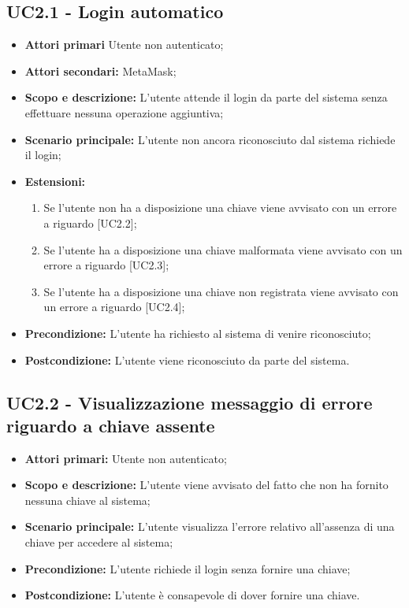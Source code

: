 \documentclass[AnalisiDeiRequisiti.tex]{subfiles}
\begin{document}
\subsection{UC2.1 - Login automatico}
\begin{itemize}
\item \textbf{Attori primari} Utente non autenticato;\\
\item \textbf{Attori secondari:} MetaMask;\\
\item \textbf{Scopo e descrizione:} L'utente attende il login da parte del sistema senza effettuare nessuna operazione aggiuntiva;\\
\item \textbf{Scenario principale:} L'utente non ancora riconosciuto dal sistema richiede il login;\\
\item \textbf{Estensioni:}\\
\begin{enumerate}
	\item Se l'utente non ha a disposizione una chiave viene avvisato con un errore a riguardo [UC2.2];
	\item Se l'utente ha a disposizione una chiave malformata viene avvisato con un errore a riguardo [UC2.3];
	\item Se l'utente ha a disposizione una chiave non registrata viene avvisato con un errore a riguardo [UC2.4];
\end{enumerate}
\item \textbf{Precondizione:} L'utente ha richiesto al sistema di venire riconosciuto;\\
\item \textbf{Postcondizione:} L'utente viene riconosciuto da parte del sistema.\\
\end{itemize}
\subsection{UC2.2 - Visualizzazione messaggio di errore riguardo a chiave assente}
\begin{itemize}
	\item \textbf{Attori primari:} Utente non autenticato;\\
	\item \textbf{Scopo e descrizione:} L'utente viene avvisato del fatto che non ha fornito nessuna chiave al sistema;\\
	\item \textbf{Scenario principale:} L'utente visualizza l'errore relativo all'assenza di una chiave per accedere al sistema;\\
	\item \textbf{Precondizione:} L'utente richiede il login senza fornire una chiave;\\
	\item \textbf{Postcondizione:} L'utente è consapevole di dover fornire una chiave. \\
\end{itemize}
\end{document}
